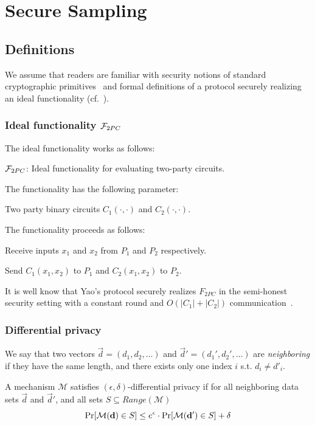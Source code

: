 \section{Secure Sampling}
\subsection{Definitions}
We assume that readers are familiar with security notions of standard
cryptographic primitives~\cite{KatzLindell2007} and formal definitions
of a protocol securely realizing an ideal functionality
(cf.~\cite{EKR18}). 

\subsubsection{Ideal functionality $\mathcal{F}_{2PC}$} 
The ideal functionality works as follows:

\bbox
{
\begin{center}
 $\mathcal{F}_{2PC}$:  Ideal functionality for evaluating two-party circuits.  
\end{center}

The functionality has the following parameter:
\BI
\item Two party binary circuits $C_1(\cdot, \cdot)$ and $C_2(\cdot, \cdot)$. 
\EI

The functionality proceeds as follows:
\BEN
\item Receive inputs $x_1$ and $x_2$ from $P_1$ and $P_2$ respectively. 
\item Send $C_1(x_1, x_2)$ to $P_1$ and $C_2(x_1, x_2)$ to $P_2$. 
\EEN 
}

\medskip

It is well know that Yao's protocol securely realizes $F_{2PC}$ in the
semi-honest security setting with a constant round and $O(|C_1| +
|C_2|)$ communication~\cite{JC:LinPin09}. 

\subsubsection{Differential privacy}
We say that two vectors $\vec{d} = (d_1, d_2, \ldots)$ and $\vec{d}' =
(d_1', d_2', \ldots)$ are \emph{neighboring} if they have the same
length, and there exists only one index $i$ s.t. $d_{i} \neq d'_{i}$.

\begin{definition}
A mechanism $\mathcal{M}$ satisfies $(\epsilon,\delta)$-differential
privacy if for all neighboring data sets $\vec{d}$ and $\vec{d}'$,
and all sets $S \subseteq Range(\mathcal{M})$ \[
\Pr[\mathcal{M}(\mathbf{d}) \in S] \le e^\epsilon \cdot \Pr[\mathcal{M}(\mathbf{d}') \in S] + \delta
\]
\end{definition}


